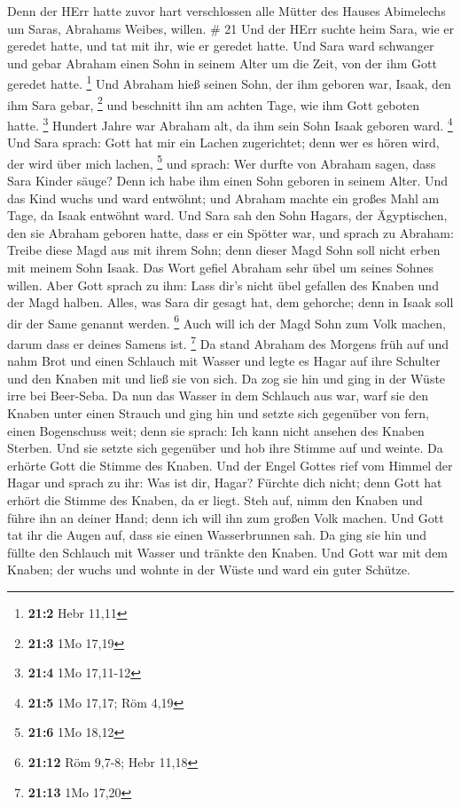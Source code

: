  Denn der HErr hatte zuvor hart verschlossen alle Mütter
des Hauses Abimelechs um Saras, Abrahams Weibes, willen. \# 21
 Und der HErr suchte heim Sara, wie er geredet hatte, und
tat mit ihr, wie er geredet hatte.  Und Sara ward schwanger
und gebar Abraham einen Sohn in seinem Alter um die Zeit, von der ihm
Gott geredet hatte. \footnote{\textbf{21:2} Hebr 11,11}  Und
Abraham hieß seinen Sohn, der ihm geboren war, Isaak, den ihm Sara
gebar, \footnote{\textbf{21:3} 1Mo 17,19}  und beschnitt ihn
am achten Tage, wie ihm Gott geboten hatte. \footnote{\textbf{21:4} 1Mo
  17,11-12}  Hundert Jahre war Abraham alt, da ihm sein Sohn
Isaak geboren ward. \footnote{\textbf{21:5} 1Mo 17,17; Röm 4,19}
 Und Sara sprach: Gott hat mir ein Lachen zugerichtet; denn
wer es hören wird, der wird über mich lachen, \footnote{\textbf{21:6}
  1Mo 18,12}  und sprach: Wer durfte von Abraham sagen, dass
Sara Kinder säuge? Denn ich habe ihm einen Sohn geboren in seinem Alter.
 Und das Kind wuchs und ward entwöhnt; und Abraham machte
ein großes Mahl am Tage, da Isaak entwöhnt ward.  Und Sara
sah den Sohn Hagars, der Ägyptischen, den sie Abraham geboren hatte,
dass er ein Spötter war,  und sprach zu Abraham: Treibe
diese Magd aus mit ihrem Sohn; denn dieser Magd Sohn soll nicht erben
mit meinem Sohn Isaak.  Das Wort gefiel Abraham sehr übel
um seines Sohnes willen.  Aber Gott sprach zu ihm: Lass
dir's nicht übel gefallen des Knaben und der Magd halben. Alles, was
Sara dir gesagt hat, dem gehorche; denn in Isaak soll dir der Same
genannt werden. \footnote{\textbf{21:12} Röm 9,7-8; Hebr 11,18}
 Auch will ich der Magd Sohn zum Volk machen, darum dass er
deines Samens ist. \footnote{\textbf{21:13} 1Mo 17,20}  Da
stand Abraham des Morgens früh auf und nahm Brot und einen Schlauch mit
Wasser und legte es Hagar auf ihre Schulter und den Knaben mit und ließ
sie von sich. Da zog sie hin und ging in der Wüste irre bei Beer-Seba.
 Da nun das Wasser in dem Schlauch aus war, warf sie den
Knaben unter einen Strauch  und ging hin und setzte sich
gegenüber von fern, einen Bogenschuss weit; denn sie sprach: Ich kann
nicht ansehen des Knaben Sterben. Und sie setzte sich gegenüber und hob
ihre Stimme auf und weinte.  Da erhörte Gott die Stimme des
Knaben. Und der Engel Gottes rief vom Himmel der Hagar und sprach zu
ihr: Was ist dir, Hagar? Fürchte dich nicht; denn Gott hat erhört die
Stimme des Knaben, da er liegt.  Steh auf, nimm den Knaben
und führe ihn an deiner Hand; denn ich will ihn zum großen Volk machen.
 Und Gott tat ihr die Augen auf, dass sie einen
Wasserbrunnen sah. Da ging sie hin und füllte den Schlauch mit Wasser
und tränkte den Knaben.  Und Gott war mit dem Knaben; der
wuchs und wohnte in der Wüste und ward ein guter Schütze.

